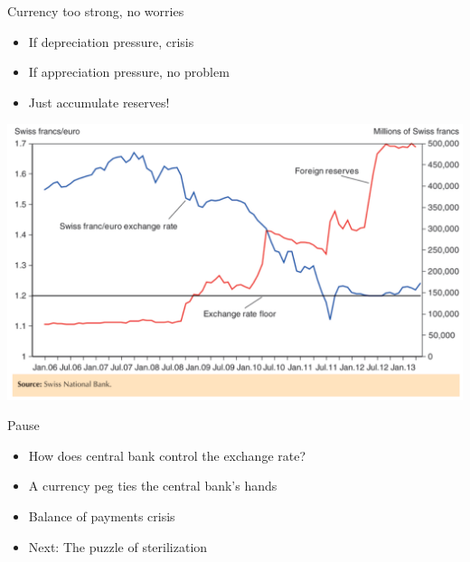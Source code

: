 \documentclass{beamer}
\begin{document}
\begin{frame}{Currency too strong, no worries}
    \begin{itemize}
        \item If depreciation pressure, crisis
        \item If appreciation pressure, no problem
        \item Just accumulate reserves!
    \end{itemize}
    \includegraphics[scale=0.2]{swiss.png}
\end{frame}

\begin{frame}{Pause}
    \begin{itemize}
        \item How does central bank control the exchange rate?
        \item A currency peg ties the central bank's hands
        \item Balance of payments crisis
        \item Next: The puzzle of sterilization
    \end{itemize}
\end{frame}
\end{document}
